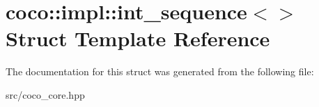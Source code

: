 \hypertarget{structcoco_1_1impl_1_1int__sequence}{}\section{coco\+:\+:impl\+:\+:int\+\_\+sequence$<$$>$ Struct Template Reference}
\label{structcoco_1_1impl_1_1int__sequence}


The documentation for this struct was generated from the following file\+:\begin{DoxyCompactItemize}
\item 
src/coco\+\_\+core.\+hpp\end{DoxyCompactItemize}
